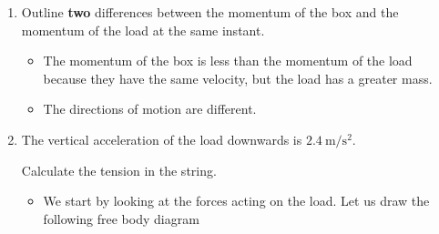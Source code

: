 \documentclass[a4paper,12pt]{article}
\begin{document}
\begin{enumerate}[label=(\alph*)]
  \item Outline \textbf{two} differences between the momentum of the box and the momentum of the load at the same instant.
        \begin{itemize}
          \item The momentum of the box is less than the momentum of the load because they have the same velocity, but the load has a greater mass.
          \item The directions of motion are different.
        \end{itemize}
  \item The vertical acceleration of the load downwards is $\SI{2.4}{\m\per\s\squared}$.

        Calculate the tension in the string.
        \begin{itemize}
          \item We start by looking at the forces acting on the load. Let us draw the following free body diagram

                \begin{figure}[H]
                  \centering
\end{figure}
\end{itemize}
\end{enumerate}
\end{document}

